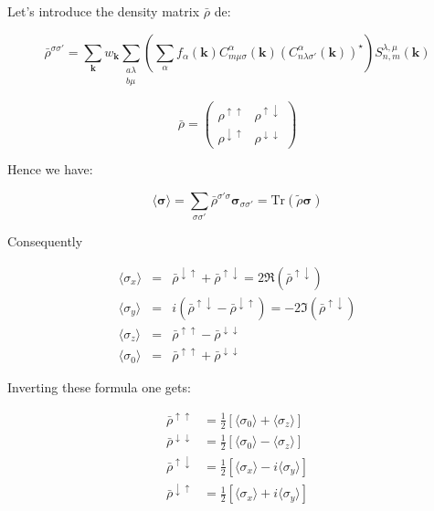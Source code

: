 \documentclass{article}
\begin{document}
\noindent Let's introduce the density matrix $\bar{\rho}$ de:

\[ \bar{\rho}^{\sigma \sigma'}=
\sum_{\mathbf{k}}  w_{\mathbf{k}}
\sum_{\substack{a \lambda\\ b \mu}} 
\left(\sum_{\alpha}
f_{\alpha}(\mathbf{k}) 
C_{m \mu \sigma}^{\alpha}(\mathbf{k})(C_{n \lambda \sigma'}^{\alpha}(\mathbf{k}))^{\star} \right)
S_{n,m}^{\lambda,\mu}(\mathbf{k}) \]

\[ \bar{\rho}=
\left( \begin{array}{cc} \rho^{\uparrow \uparrow} & \rho^{\uparrow \downarrow} \\
\rho^{\downarrow \uparrow} & \rho^{\downarrow 
\downarrow}
\end{array} \right) \]

\noindent
Hence we have:

\[\langle \bm{\sigma}\rangle= \sum_{\sigma \sigma'} \bar{\rho}^{\sigma' \sigma} \bm{\sigma}_{\sigma \sigma'}=
\text{Tr} (\tilde{\rho}\bm{\sigma}) \]



\noindent
Consequently

\[ \begin{array}{lcl} 
\langle \sigma_x \rangle&=&     \bar{\rho}^{\downarrow \uparrow} +  \bar{\rho}^{\uparrow \downarrow} = 2\Re(\bar{\rho}^{\uparrow \downarrow}) \\ 
\langle \sigma_y\rangle &=&   i(\bar{\rho}^{\uparrow \downarrow} - \bar{\rho}^{\downarrow \uparrow} )= -2\Im(\bar{\rho}^{\uparrow \downarrow}) \\ 
\langle \sigma_z \rangle&=&     \bar{\rho}^{\uparrow \uparrow}    -  \bar{\rho}^{\downarrow \downarrow} \\
\langle\sigma_0 \rangle&=&     \bar{\rho}^{\uparrow \uparrow}    +  \bar{\rho}^{\downarrow \downarrow}
\end{array}
\]

\noindent
Inverting these formula one gets:

\begin{align*}
 \bar{\rho}^{\uparrow \uparrow}      &=  \displaystyle \frac{1}{2}[\langle \sigma_0\rangle+  \langle\sigma_z\rangle]     \\ 
 \bar{\rho}^{\downarrow \downarrow}  &=  \displaystyle \frac{1}{2}[\langle\sigma_0\rangle-  \langle\sigma_z\rangle]   \\ 
 \bar{\rho}^{\uparrow \downarrow}    &=  \displaystyle \frac{1}{2}[\langle\sigma_x\rangle- i\langle\sigma_y\rangle]   \\
 \bar{\rho}^{\downarrow \uparrow}    &=  \displaystyle \frac{1}{2}[\langle\sigma_x\rangle+ i\langle\sigma_y\rangle]   
\end{align*}
\end{document}

